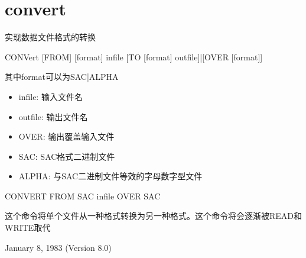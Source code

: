 \section{convert}
\label{cmd:convert}

实现数据文件格式的转换

CONVert [FROM] [format] infile [TO [format] outfile]|[OVER [format]]

其中format可以为SAC|ALPHA

\begin{itemize}
\item infile: 输入文件名
\item outfile: 输出文件名
\item OVER: 输出覆盖输入文件
\item SAC: SAC格式二进制文件
\item ALPHA: 与SAC二进制文件等效的字母数字型文件
\end{itemize}

CONVERT FROM SAC infile OVER SAC

这个命令将单个文件从一种格式转换为另一种格式。这个命令将会逐渐被READ和WRITE取代

January 8, 1983 (Version 8.0)
